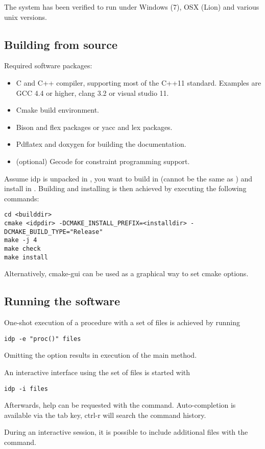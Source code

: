 
The system has been verified to run under Windows (7), OSX (Lion) and various unix versions.

\subsection{Building from source}
Required software packages:
\begin{itemize}
  \item C and C++ compiler, supporting most of the C++11 standard. Examples are GCC 4.4 or higher, clang 3.2 or visual studio 11.
  \item Cmake build environment. 
  \item Bison and flex packages or yacc and lex packages.
  \item Pdflatex and doxygen for building the documentation.
  \item (optional) Gecode for constraint programming support.
\end{itemize}

Assume idp is unpacked in , you want to build in  (cannot be the same as ) and install in . Building and installing is then achieved by executing the following commands:
\begin{lstlisting}
cd <builddir>
cmake <idpdir> -DCMAKE_INSTALL_PREFIX=<installdir> -DCMAKE_BUILD_TYPE="Release"
make -j 4
make check
make install
\end{lstlisting}

Alternatively, cmake-gui can be used as a graphical way to set cmake options.

\subsection{Running the software}
One-shot execution of a procedure  with a set of files  is achieved by running
\begin{lstlisting}
idp -e "proc()" files
\end{lstlisting}
Omitting the  option results in execution of the main method.

An interactive interface using the set of files  is started with 
\begin{lstlisting}
idp -i files
\end{lstlisting}

Afterwards, help can be requested with the  command. Auto-completion is available via the tab key, ctrl-r will search the command history.

During an interactive session, it is possible to include additional files with the command. 
